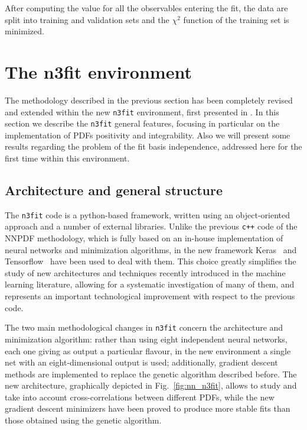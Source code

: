 %
After computing the value for all the observables entering the fit, the data are split into training and 
validation sets and the $\chi^2$ function of the training set is minimized.



\section{The n3fit environment}
\label{sec:n3fit}
The methodology described in the previous section has been completely revised and extended within the new
{\tt n3fit} environment, first presented in \cite{Carrazza:2019mzf}.
In this section we describe the {\tt n3fit} general features, focusing in particular
on the implementation of PDFs positivity and integrability. 
Also we will present some results regarding the problem of the fit basis independence, addressed here for the first time
within this environment.

\subsection{Architecture and general structure}
The {\tt n3fit} code is a python-based framework, written using an object-oriented approach and
a number of external libraries. 
Unlike the previous {\tt c++} code of the NNPDF methodology, 
which is fully based on an in-house implementation of neural networks and minimization algorithms,
in the new framework Keras~\cite{chollet2015keras} and Tensorflow~\cite{tensorflow2015-whitepaper} have been used to deal with them.
This choice greatly simplifies the study of new architectures and techniques recently introduced
in the machine learning literature, allowing for a systematic investigation of many of them, 
and represents an important technological improvement with respect 
to the previous code. 

%
The two main methodological changes in {\tt n3fit} concern the architecture and minimization algorithm:
rather than using eight independent neural networks, each one giving as output a particular flavour, in
the new environment a single net with an eight-dimensional output is used; additionally, gradient descent
methods are implemented to replace the genetic algorithm described before.
The new architecture, graphically depicted in Fig.~\ref{fig:nn_n3fit}, allows to study and take into account 
cross-correlations between different PDFs,
while the new gradient descent minimizers have been proved to produce more stable fits than those 
obtained using the genetic algorithm. 

